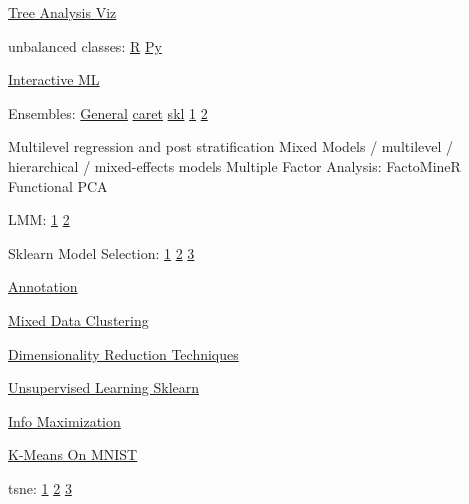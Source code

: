 \documentclass[]{book}
\begin{document}
\href{http://etetoolkit.org/}{Tree Analysis Viz}

unbalanced classes: \href{https://cran.r-project.org/web/packages/imbalance/index.html}{R} \href{http://contrib.scikit-learn.org/imbalanced-learn/stable/}{Py}

\href{http://www.creativeai.net/posts/eivW6BvrrpyPf282d/interactive-machine-learning-an-overview-in-5-videos}{Interactive ML}

Ensembles: \href{http://mlwave.com/kaggle-ensembling-guide/}{General} \href{http://amunategui.github.io/blending-models/}{caret} \href{https://www.toptal.com/machine-learning/ensemble-methods-machine-learning}{skl} \href{http://blog.kaggle.com/2016/12/27/a-kagglers-guide-to-model-stacking-in-practice/}{1} \href{http://blog.kaggle.com/2017/06/15/stacking-made-easy-an-introduction-to-stacknet-by-competitions-grandmaster-marios-michailidis-kazanova/}{2}

Multilevel regression and post stratification Mixed Models / multilevel / hierarchical / mixed-effects models Multiple Factor Analysis: FactoMineR Functional PCA

LMM: \href{http://edwardlib.org/tutorials/linear-mixed-effects-models}{1} \href{https://ourcodingclub.github.io/2017/03/15/mixed-models.html}{2}

Sklearn Model Selection: \href{http://scikit-learn.org/stable/modules/generated/sklearn.model_selection.GroupKFold.html}{1} \href{http://scikit-learn.org/stable/modules/generated/sklearn.model_selection.LeaveOneGroupOut.html}{2} \href{http://scikit-learn.org/stable/modules/generated/sklearn.model_selection.LeavePGroupsOut.html}{3}

\href{https://explosion.ai/blog/prodigy-annotation-tool-active-learning}{Annotation}

\href{https://www.r-bloggers.com/clustering-mixed-data-types-in-r/}{Mixed Data Clustering}

\href{https://colah.github.io/posts/2014-10-Visualizing-MNIST/}{Dimensionality Reduction Techniques}

\href{http://opensource.datacratic.com/mtlpy50/}{Unsupervised Learning Sklearn}

\href{http://www.inference.vc/unsupervised-learning-by-predicting-noise-an-information-maximization-view-2/}{Info Maximization}

\href{http://johnloeber.com/docs/kmeans.html}{K-Means On MNIST}

tsne: \href{http://distill.pub/2016/misread-tsne/}{1} \href{https://lvdmaaten.github.io/tsne/}{2} \href{https://index.pocketcluster.io/harveyslash-tsne-embedding-visualisation.html}{3}
\end{document}

